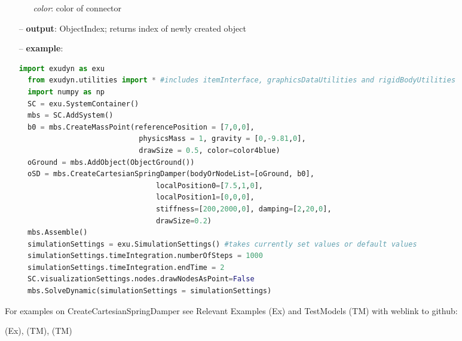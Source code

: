 \begin{itemize}[leftmargin=0.7cm]
\begin{itemize}[leftmargin=1.2cm]
\item[]{\it color}: color of connector
\end{itemize}
\item[--]
{\bf output}: ObjectIndex; returns index of newly created object
\item[--]
{\bf example}: \vspace{-12pt}\ei\begin{lstlisting}[language=Python, xleftmargin=36pt]
  import exudyn as exu
  from exudyn.utilities import * #includes itemInterface, graphicsDataUtilities and rigidBodyUtilities
  import numpy as np
  SC = exu.SystemContainer()
  mbs = SC.AddSystem()
  b0 = mbs.CreateMassPoint(referencePosition = [7,0,0],
                            physicsMass = 1, gravity = [0,-9.81,0],
                            drawSize = 0.5, color=color4blue)
  oGround = mbs.AddObject(ObjectGround())
  oSD = mbs.CreateCartesianSpringDamper(bodyOrNodeList=[oGround, b0],
                                localPosition0=[7.5,1,0],
                                localPosition1=[0,0,0],
                                stiffness=[200,2000,0], damping=[2,20,0],
                                drawSize=0.2)
  mbs.Assemble()
  simulationSettings = exu.SimulationSettings() #takes currently set values or default values
  simulationSettings.timeIntegration.numberOfSteps = 1000
  simulationSettings.timeIntegration.endTime = 2
  SC.visualizationSettings.nodes.drawNodesAsPoint=False
  mbs.SolveDynamic(simulationSettings = simulationSettings)
\end{lstlisting}\vspace{-24pt}\bi\item[]\vspace{-24pt}\vspace{12pt}\end{itemize}
%

%
\noindent For examples on CreateCartesianSpringDamper see Relevant Examples (Ex) and TestModels (TM) with weblink to github:
\bi
 \item \footnotesize {} (Ex), 
 (TM), 
 (TM)
\ei

